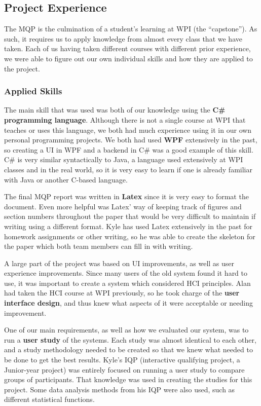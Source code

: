 \begin{doublespace}
\subsection{Project Experience}
The MQP is the culmination of a student's learning at WPI (the ``capstone''). As such, it requires us to apply knowledge from almost every class that we have taken. Each of us having taken different courses with different prior experience, we were able to figure out our own individual skills and how they are applied to the project.

\subsubsection{Applied Skills}
The main skill that was used was both of our knowledge using the \textbf{C\# programming language}. Although there is not a single course at WPI that teaches or uses this language, we both had much experience using it in our own personal programming projects. We both had used \textbf{WPF} extensively in the past, so creating a UI in WPF and a backend in C\# was a good example of this skill. C\# is very similar syntactically to Java, a language used extensively at WPI classes and in the real world, so it is very easy to learn if one is already familiar with Java or another C-based language.

The final MQP report was written in \textbf{Latex} since it is very easy to format the document. Even more helpful was Latex' way of keeping track of figures and section numbers throughout the paper that would be very difficult to maintain if writing using a different format. Kyle has used Latex extensively in the past for homework assignments or other writing, so he was able to create the skeleton for the paper which both team members can fill in with writing.

A large part of the project was based on UI improvements, as well as user experience improvements. Since many users of the old system found it hard to use, it was important to create a system which considered HCI principles. Alan had taken the HCI course at WPI previously, so he took charge of the \textbf{user interface design}, and thus knew what aspects of it were acceptable or needing improvement.

One of our main requirements, as well as how we evaluated our system, was to run a \textbf{user study} of the systems. Each study was almost identical to each other, and a study methodology needed to be created so that we knew what needed to be done to get the best results. Kyle's IQP (interactive qualifying project, a Junior-year project) was entirely focused on running a user study to compare groups of participants. That knowledge was used in creating the studies for this project. Some data analysis methods from his IQP were also used, such as different statistical functions.


\end{doublespace}
